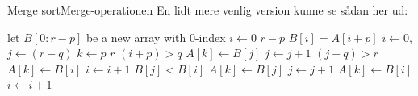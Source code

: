 \documentclass[aspectratio=1610]{beamer}
\begin{document}
\begin{frame}{Merge sort}{Merge-operationen}
    En lidt mere venlig version kunne se sådan her ud:

    \centering
    \begin{minipage}{.8\textwidth}
        \scriptsize
        \begin{tcolorbox}
            
            \vspace{-\abovedisplayskip}
            \begin{codebox}
                \li let $B[0:r-p]$ be a new array with 0-index
                \li \For $i \gets 0$ \To $r-p$ \Do
                    \li $B[i] = A[i+p]$
                \End
                \li $i \gets 0$, $j \gets (r-q)$
                \li \For $k \gets p$ \To $r$ \Do
                    \li \If $(i + p) > q$ \Then
                        \li $A[k] \gets B[j]$
                        \li $j \gets j + 1$
                    \li \ElseIf $(j + q) > r$ \Then
                        \li $A[k] \gets B[i]$
                        \li $i \gets i + 1$
                    \li \ElseIf $B[j] < B[i]$ \Then
                        \li $A[k] \gets B[j]$
                        \li $j \gets j + 1$
                    \li \Else
                        \li $A[k] \gets B[i]$
                        \li $i \gets i + 1$
                    \End
                \End
            \end{codebox}
        \end{tcolorbox}
    \end{minipage}
\end{frame}
\end{document}
